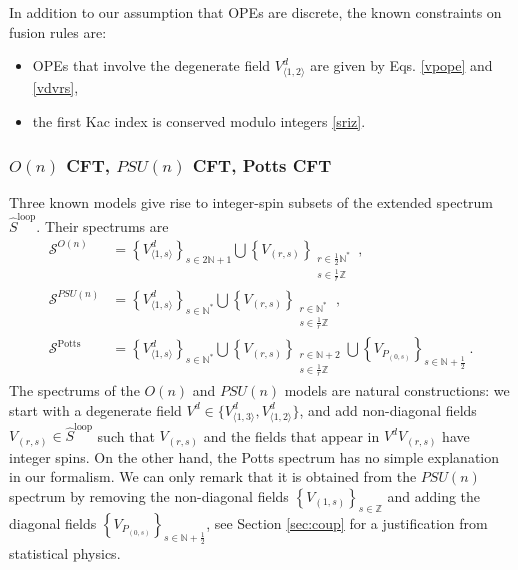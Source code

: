 \documentclass[12pt, a4paper]{article}
\begin{document}
In addition to our assumption that OPEs are discrete, the known constraints on fusion rules are:
\begin{itemize}
\item OPEs that involve the degenerate field $V^d_{\langle 1,2\rangle}$ are given by Eqs. \eqref{vpope} and \eqref{vdvrs}, 
 \item the first Kac index is conserved modulo integers \eqref{sriz}.
\end{itemize}

\subsubsection{$O(n)$ CFT, $PSU(n)$ CFT, Potts CFT}\label{sec:models}

Three known models give rise to integer-spin subsets of the extended spectrum $\widehat{S}^\text{loop}$. 
Their spectrums are 
\begin{align}
\mathcal{S}^{O(n)} &= \left\{V^d_{\langle 1,s\rangle}\right\}_{s\in 2\mathbb{N}+1} \bigcup \left\{V_{(r,s)}\right\}_{\substack{r\in \frac12\mathbb{N}^*\\ s\in\frac{1}{r}\mathbb{Z}}}  \ ,
\label{son}
 \\
 \mathcal{S}^{PSU(n)} &= \left\{V^d_{\langle 1,s\rangle}\right\}_{s\in\mathbb{N}^*} \bigcup \left\{V_{(r,s)}\right\}_{\substack{r\in \mathbb{N}^*\\ s\in\frac{1}{r}\mathbb{Z}}}  \ ,
 \label{sun}
 \\
 \mathcal{S}^\text{Potts} &= \left\{V^d_{\langle 1,s\rangle}\right\}_{s\in\mathbb{N}^*} \bigcup \left\{V_{(r,s)}\right\}_{\substack{r\in \mathbb{N}+2\\ s\in\frac{1}{r}\mathbb{Z}}} \bigcup  \left\{ V_{P_{(0,s)}}\right\}_{s\in \mathbb{N}+\frac12}\ .
 \label{spotts}
\end{align}
The spectrums of the $O(n)$ and $PSU(n)$ models are natural constructions: we start with a degenerate field $V^d\in\{V^d_{\langle 1,3\rangle},V^d_{\langle 1,2\rangle}\}$, and add non-diagonal fields $V_{(r,s)}\in\widehat{S}^\text{loop}$ such that $V_{(r,s)}$ and the fields that appear in $V^dV_{(r,s)}$ have integer spins. 
On the other hand, the Potts spectrum has no simple explanation in our formalism. We can only remark that it is obtained from the $PSU(n)$ spectrum by removing the non-diagonal fields $\left\{V_{(1,s)}\right\}_{s\in\mathbb{Z}}$ and adding the diagonal fields $\left\{ V_{P_{(0,s)}}\right\}_{s\in \mathbb{N}+\frac12}$, see Section \ref{sec:coup} for a justification from statistical physics.  
\end{document}
